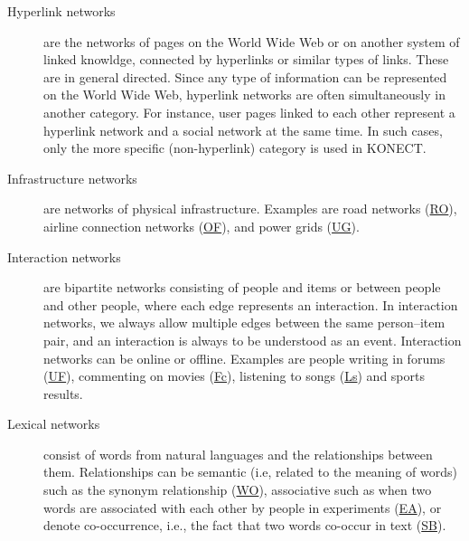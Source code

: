 \documentclass{article}
\begin{document}
\begin{description}
\item[Hyperlink networks] are the
  networks  of pages on the World Wide Web
  or on another system of linked knowldge,
  connected by hyperlinks or similar types of links.  These are in general directed.  Since any
  type of information can be represented on the World Wide Web,
  hyperlink networks are often simultaneously in another category.  For
  instance, user pages linked to each other represent a hyperlink
  network and a social network at the same time.  In such cases, only
  the more specific (non-hyperlink) category is used in KONECT.

\item[Infrastructure networks] are networks of physical infrastructure.  
  Examples are road networks
  (\href{http://konect.cc/networks/roadNet-CA/}{\textsf{RO}}), airline
  connection networks
  (\href{http://konect.cc/networks/opsahl-openflights/}{\textsf{OF}}), 
  and power grids
  (\href{http://konect.cc/networks/opsahl-powergrid/}{\textsf{UG}}).  
  
\item[Interaction networks] are bipartite networks consisting of people
  and items or between people and other people, where each edge represents an interaction. 
  In interaction networks, we always allow multiple edges between the
  same person--item pair, and an interaction is always to be understood as an event. 
  Interaction networks can be online or offline.
  Examples are
  people writing in forums
  (\href{http://konect.cc/networks/opsahl-ucforum/}{\textsf{UF}}),
  commenting on movies
  (\href{http://konect.cc/networks/filmtipset_comment/}{\textsf{Fc}}),
  listening to songs
  (\href{http://konect.cc/networks/lastfm_song/}{\textsf{Ls}})
  and sports results. 

\item[Lexical networks] consist of words from natural 
   languages and the relationships between
  them.  Relationships can be semantic (i.e, related to the meaning of
  words) such as the synonym relationship
  (\href{http://konect.cc/networks/wordnet-words/}{\textsf{WO}}),
  associative such as when two words are associated with each other by
  people in experiments
  (\href{http://konect.cc/networks/eat/}{\textsf{EA}}), or denote
  co-occurrence, i.e., the fact that two words co-occur in text
  (\href{http://konect.cc/networks/lasagne-spanishbook/}{\textsf{SB}}).


\end{description}
\end{document}
